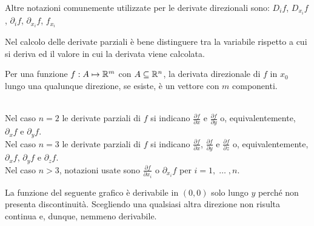 \begin{definition}
	\begin{note}
		Altre notazioni comunemente utilizzate per le derivate direzionali sono: $D_i f$, $D_{x_i} f$, $\partial_i f$, $\partial_{x_i} f$, $f_{x_i}$
	\end{note}
	\begin{note}
		Nel calcolo delle derivate parziali è bene distinguere tra la variabile rispetto a cui si deriva ed il valore in cui la derivata viene calcolata.
	\end{note}
	\begin{note}
		Per una funzione $f: A \mapsto \mathbb{R}^m$ con $A \subseteq \mathbb{R}^n$, la derivata direzionale di $f$ in $x_0$ lungo una qualunque direzione, se esiste, è un vettore con $m$ componenti.
	\end{note}
	\begin{note}\hfill\\
		Nel caso $n = 2$ le derivate parziali di $f$ si indicano $\frac{\partial f}{\partial x}$ e $\frac{\partial f}{\partial y}$ o, equivalentemente, $\partial_x f$ e $\partial_y f$.\\
		Nel caso $n = 3$ le derivate parziali di $f$ si indicano $\frac{\partial f}{\partial x}$, $\frac{\partial f}{\partial y}$ e $\frac{\partial f}{\partial z}$ o, equivalentemente, $\partial_x f$, $\partial_y f$ e $\partial_z f$.\\
		Nel caso $n > 3$, notazioni usate sono $\frac{\partial f}{\partial x_i}$ o $\partial_{x_i} f$ per $i = 1,\;\dotsc\;,n$.
	\end{note}
\end{definition}
\begin{example}
	\label{ex:deriv_solo_alcune_direz}
	La funzione del seguente grafico è derivabile in $(0,0)$ solo lungo $y$ perché non presenta discontinuità. Scegliendo una qualsiasi altra direzione non risulta continua e, dunque, nemmeno derivabile.
	\begin{figure}[H]
		\begin{subfigure}{.49\textwidth}
			\centering
		\end{subfigure}
		\begin{subfigure}{.49\textwidth}
			\centering
		\end{subfigure}
	\end{figure}
\end{example}
